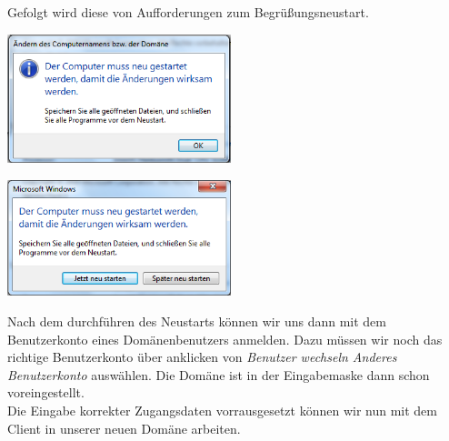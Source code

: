\documentclass[12pt,a4paper,titlepage]{scrartcl} %
\begin{document}
Gefolgt wird diese von Aufforderungen zum Begrüßungsneustart.\\

	\begin{center}\includegraphics[width=6.5cm]{Bilder/Client/Client06}\\ \end{center}
	
	\begin{center}\includegraphics[width=6.5cm]{Bilder/Client/Client07}\\ \end{center}

Nach dem durchführen des Neustarts können wir uns dann mit dem Benutzerkonto eines Domänenbenutzers anmelden. Dazu müssen wir noch das richtige Benutzerkonto über anklicken von \emph{Benutzer wechseln  Anderes Benutzerkonto} auswählen. Die Domäne ist in der Eingabemaske dann schon voreingestellt.\\
Die Eingabe korrekter Zugangsdaten vorrausgesetzt können wir nun mit dem Client in unserer neuen Domäne arbeiten.
\end{document}
